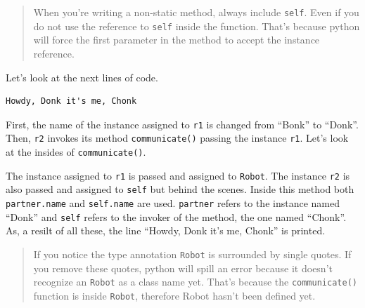 \begin{quote}
When you're writing a non-static method, always include \texttt{self}.
Even if you do not use the reference to \texttt{self} inside the
function. That's because python will force the first parameter in the
method to accept the instance reference.
\end{quote}

Let's look at the next lines of code.

\begin{Shaded}
\begin{Highlighting}[]

\OperatorTok{=} 

\end{Highlighting}
\end{Shaded}

\begin{verbatim}
Howdy, Donk it's me, Chonk
\end{verbatim}

First, the name of the instance assigned to \texttt{r1} is changed from
``Bonk'' to ``Donk''. Then, \texttt{r2} invokes its method
\texttt{communicate()} passing the instance \texttt{r1}. Let's look at
the insides of \texttt{communicate()}.

\begin{Shaded}
\begin{Highlighting}[]
\NormalTok{):}
    \NormalTok{(}\OperatorTok{+}\OperatorTok{+} \OperatorTok{+} 
\end{Highlighting}
\end{Shaded}

The instance assigned to \texttt{r1} is passed and assigned to
\texttt{Robot}. The instance \texttt{r2} is also passed and assigned to
\texttt{self} but behind the scenes. Inside this method both
\texttt{partner.name} and \texttt{self.name} are used. \texttt{partner}
refers to the instance named ``Donk'' and \texttt{self} refers to the
invoker of the method, the one named ``Chonk''. As, a resilt of all
these, the line ``Howdy, Donk it's me, Chonk'' is printed.

\begin{quote}
If you notice the type annotation \texttt{Robot} is surrounded by single
quotes. If you remove these quotes, python will spill an error because
it doesn't recognize an \texttt{Robot} as a class name yet. That's
because the \texttt{communicate()} function is inside \texttt{Robot},
therefore Robot hasn't been defined yet.
\end{quote}

